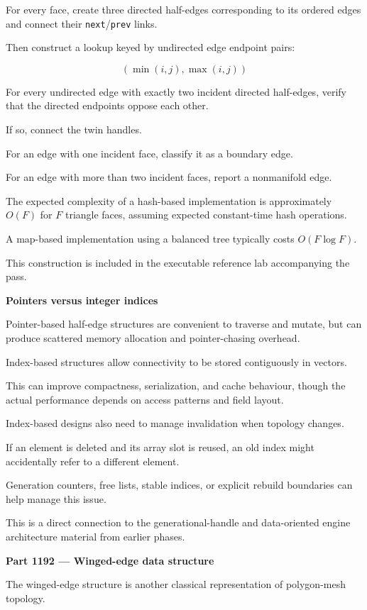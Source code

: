 For every face, create three directed half-edges corresponding to its ordered edges and connect their \texttt{next}/\texttt{prev} links.

Then construct a lookup keyed by undirected edge endpoint pairs:

\[
(\min(i,j),\max(i,j))
\]

For every undirected edge with exactly two incident directed half-edges, verify that the directed endpoints oppose each other.

If so, connect the twin handles.

For an edge with one incident face, classify it as a boundary edge.

For an edge with more than two incident faces, report a nonmanifold edge.

The expected complexity of a hash-based implementation is approximately \(O(F)\) for \(F\) triangle faces, assuming expected constant-time hash operations.

A map-based implementation using a balanced tree typically costs \(O(F\log F)\).

This construction is included in the executable reference lab accompanying the pass.

\textbf{Pointers versus integer indices}

Pointer-based half-edge structures are convenient to traverse and mutate, but can produce scattered memory allocation and pointer-chasing overhead.

Index-based structures allow connectivity to be stored contiguously in vectors.

This can improve compactness, serialization, and cache behaviour, though the actual performance depends on access patterns and field layout.

Index-based designs also need to manage invalidation when topology changes.

If an element is deleted and its array slot is reused, an old index might accidentally refer to a different element.

Generation counters, free lists, stable indices, or explicit rebuild boundaries can help manage this issue.

This is a direct connection to the generational-handle and data-oriented engine architecture material from earlier phases.

\textbf{Part 1192 --- Winged-edge data structure}

The winged-edge structure is another classical representation of polygon-mesh topology.

